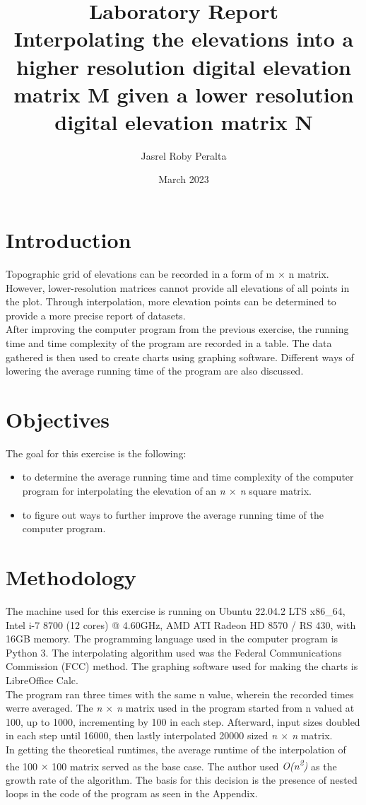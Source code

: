 \documentclass{article}
\title{
\textbf{Laboratory Report} \\
\large Interpolating the elevations into a higher resolution digital elevation matrix M given a lower resolution digital elevation matrix N
}
\author{Jasrel Roby Peralta}
\date{March 2023}
\begin{document}
\maketitle

\section*{Introduction}
\hspace{\parindent} Topographic grid of elevations can be recorded in a form of m $\times$ n matrix. However, lower-resolution matrices cannot provide all elevations of all points in the plot. Through interpolation, more elevation points can be determined to provide a more precise report of datasets. \\
\indent After improving the computer program from the previous exercise, the running time and time complexity of the program are recorded in a table. The data gathered is then used to create charts using graphing software. Different ways of lowering the average running time of the program are also discussed.

\section*{Objectives}
The goal for this exercise is the following:
\begin{itemize}
    \item to determine the average running time and time complexity of the computer program for interpolating the elevation of an \emph{n $\times$ n} square matrix.
    \item to figure out ways to further improve the average running time of the computer program.
\end{itemize}

\section*{Methodology} 
\hspace{\parindent} The machine used for this exercise is running on Ubuntu 22.04.2 LTS x86\_64, Intel i-7 8700 (12 cores) @ 4.60GHz, AMD ATI Radeon HD 8570 / RS 430, with 16GB memory. The programming language used in the computer program is Python 3. The interpolating algorithm used was the Federal Communications Commission (FCC) method. The graphing software used for making the charts is LibreOffice Calc. \\
\indent The program ran three times with the same n value, wherein the recorded times werre averaged. The \emph{n $\times$ n} matrix used in the program started from n valued at 100, up to 1000, incrementing by 100 in each step. Afterward, input sizes doubled in each step until 16000, then lastly interpolated 20000 sized \emph{n $\times$ n} matrix. \\
\indent In getting the theoretical runtimes, the average runtime of the interpolation of the 100 $\times$ 100 matrix served as the base case. The author used \emph{O(n\textsuperscript{2})} as the growth rate of the algorithm. The basis for this decision is the presence of nested loops in the code of the program as seen in the Appendix.
\end{document}
